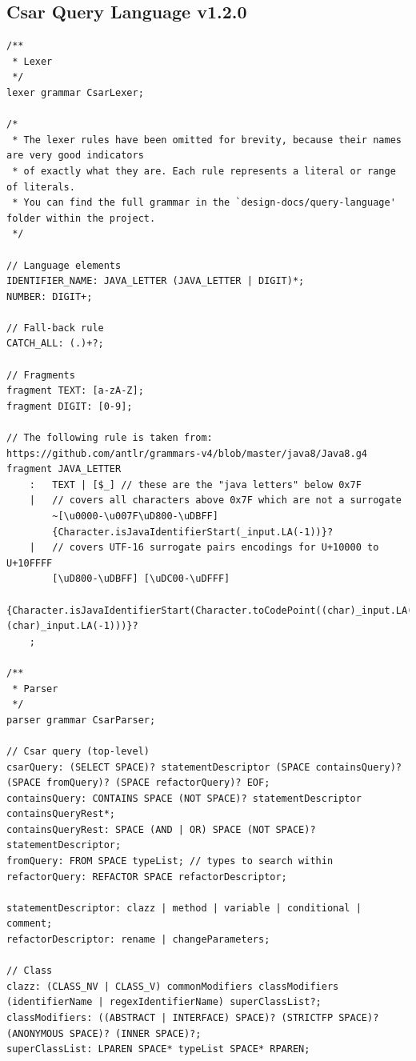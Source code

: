 \documentclass[12pt, letterpaper]{article}
\begin{document}
\subsection{Csar Query Language v1.2.0}
\label{apx:CsarQueryLanguagev120}

\begin{lstlisting}
/**
 * Lexer
 */
lexer grammar CsarLexer;

/*
 * The lexer rules have been omitted for brevity, because their names are very good indicators
 * of exactly what they are. Each rule represents a literal or range of literals.
 * You can find the full grammar in the `design-docs/query-language' folder within the project.
 */

// Language elements
IDENTIFIER_NAME: JAVA_LETTER (JAVA_LETTER | DIGIT)*;
NUMBER: DIGIT+;

// Fall-back rule
CATCH_ALL: (.)+?;

// Fragments
fragment TEXT: [a-zA-Z];
fragment DIGIT: [0-9];

// The following rule is taken from: https://github.com/antlr/grammars-v4/blob/master/java8/Java8.g4
fragment JAVA_LETTER
    :   TEXT | [$_] // these are the "java letters" below 0x7F
    |   // covers all characters above 0x7F which are not a surrogate
        ~[\u0000-\u007F\uD800-\uDBFF]
        {Character.isJavaIdentifierStart(_input.LA(-1))}?
    |	// covers UTF-16 surrogate pairs encodings for U+10000 to U+10FFFF
        [\uD800-\uDBFF] [\uDC00-\uDFFF]
        {Character.isJavaIdentifierStart(Character.toCodePoint((char)_input.LA(-2), (char)_input.LA(-1)))}?
    ;

/**
 * Parser
 */
parser grammar CsarParser;

// Csar query (top-level)
csarQuery: (SELECT SPACE)? statementDescriptor (SPACE containsQuery)? (SPACE fromQuery)? (SPACE refactorQuery)? EOF;
containsQuery: CONTAINS SPACE (NOT SPACE)? statementDescriptor containsQueryRest*;
containsQueryRest: SPACE (AND | OR) SPACE (NOT SPACE)? statementDescriptor;
fromQuery: FROM SPACE typeList; // types to search within
refactorQuery: REFACTOR SPACE refactorDescriptor;

statementDescriptor: clazz | method | variable | conditional | comment;
refactorDescriptor: rename | changeParameters;

// Class
clazz: (CLASS_NV | CLASS_V) commonModifiers classModifiers (identifierName | regexIdentifierName) superClassList?;
classModifiers: ((ABSTRACT | INTERFACE) SPACE)? (STRICTFP SPACE)? (ANONYMOUS SPACE)? (INNER SPACE)?;
superClassList: LPAREN SPACE* typeList SPACE* RPAREN;


\end{lstlisting}
\end{document}
